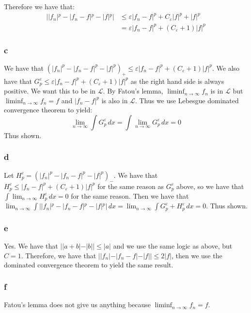 \documentclass{article}
\theoremstyle{definition}
\numberwithin{theorem}{section}
\numberwithin{equation}{section}
\begin{document}
Therefore we have that:
\begin{align*}
	| |f_n|^p - |f_n - f|^p - |f|^p | &\leq  \varepsilon |f_n - f|^p + C_\varepsilon |f|^p + |f|^p \\
	&=  \varepsilon |f_n - f|^p +( C_\varepsilon + 1) |f|^p
\end{align*}

\subsubsection*{c}
 We have that $(|f_n|^p - |f_n - f|^p - |f|^p)_+ \leq \varepsilon |f_n - f|^p +( C_\varepsilon + 1) |f|^p$. We also have that $G^\varepsilon_p \leq \varepsilon |f_n - f|^p +( C_\varepsilon + 1) |f|^p$ as the right hand side is always positive. We want this to be in $\mathcal{L}$. By Fatou's lemma, $\liminf_{n \rightarrow \infty} f_n$ is in $\mathcal{L}$ but $\liminf_{n \rightarrow \infty} f_n = f$ and $|f_n - f|^p$ is also in $\mathcal{L}$. Thus we use Lebesgue dominated convergence theorem to yield:
 \begin{equation}
 	\lim_{n \rightarrow \infty} \int  G^\varepsilon_p \, dx = \int \lim_{n \rightarrow \infty} G^\varepsilon_p \, dx = 0
 \end{equation}
 Thus shown. 
\subsubsection*{d}
Let $H^\varepsilon_p = (|f_n|^p - |f_n - f|^p - |f|^p)_-$. We have that $H^\varepsilon_p \leq |f_n - f|^p +( C_\varepsilon + 1) |f|^p$ for the same reason as $G^\varepsilon_p$ above, so we have that $\int \lim_{n \rightarrow \infty} H^\varepsilon_p \, dx = 0$ for the same reason. Then we have that $\lim_{n \rightarrow \infty}\int | |f_n|^p - |f_n - f|^p - |f|^p | \, dx = \lim_{n \rightarrow \infty} \int G^\varepsilon_p + H^\varepsilon_p \, dx = 0$. Thus shown.
\subsubsection*{e}
Yes. We have that $| |a + b| - |b|| \leq |a|$ and we use the same logic as above, but $C = 1$. Therefore, we have that $||f_n| - |f_n - f| - |f|| \leq 2 |f|$, then we use the dominated convergence theorem to yield the same result.
\subsubsection*{f}
Fatou's lemma does not give us anything because $\liminf_{n \rightarrow \infty} f_n = f$. 
\end{document}
